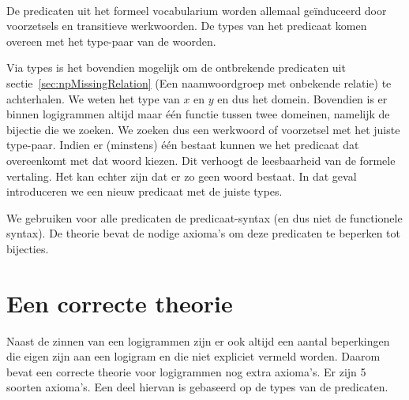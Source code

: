 \paragraph{} De predicaten uit het formeel vocabularium worden allemaal geïnduceerd door voorzetsels en transitieve werkwoorden. De types van het predicaat komen overeen met het type-paar van de woorden. 

Via types is het bovendien mogelijk om de ontbrekende predicaten uit sectie~\ref{sec:npMissingRelation} (Een naamwoordgroep met onbekende relatie) te achterhalen. We weten het type van $x$ en $y$ en dus het domein. Bovendien is er binnen logigrammen altijd maar één functie tussen twee domeinen, namelijk de bijectie die we zoeken. We zoeken dus een werkwoord of voorzetsel met het juiste type-paar. Indien er (minstens) één bestaat kunnen we het predicaat dat overeenkomt met dat woord kiezen. Dit verhoogt de leesbaarheid van de formele vertaling. Het kan echter zijn dat er zo geen woord bestaat. In dat geval introduceren we een nieuw predicaat met de juiste types.

We gebruiken voor alle predicaten de predicaat-syntax (en dus niet de functionele syntax). De theorie bevat de nodige axioma's om deze predicaten te beperken tot bijecties.



\section{Een correcte theorie}
Naast de zinnen van een logigrammen zijn er ook altijd een aantal beperkingen die eigen zijn aan een logigram en die niet expliciet vermeld worden. Daarom bevat een correcte theorie voor logigrammen nog extra axioma's. Er zijn 5 soorten axioma's. Een deel hiervan is gebaseerd op de types van de predicaten.

